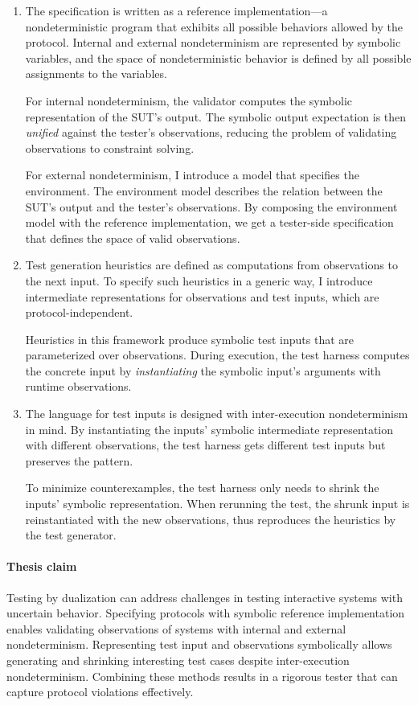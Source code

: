 \begin{enumerate}
\item The specification is written as a reference implementation---a
  nondeterministic program that exhibits all possible behaviors allowed by the
  protocol.  Internal and external nondeterminism are represented by symbolic
  variables, and the space of nondeterministic behavior is defined by all
  possible assignments to the variables.

  For internal nondeterminism, the validator computes the symbolic
  representation of the SUT's output.  The symbolic output expectation is then
  {\em unified} against the tester's observations, reducing the problem of
  validating observations to constraint solving.

  For external nondeterminism, I introduce a model that specifies the
  environment.  The environment model describes the relation between the SUT's
  output and the tester's observations.  By composing the environment model with
  the reference implementation, we get a tester-side specification that defines
  the space of valid observations.
\item Test generation heuristics are defined as computations from observations
  to the next input.  To specify such heuristics in a generic way, I introduce
  intermediate representations for observations and test inputs, which are
  protocol-independent.

  Heuristics in this framework produce symbolic test inputs that are
  parameterized over observations.  During execution, the test harness computes
  the concrete input by {\em instantiating} the symbolic input's arguments with
  runtime observations.
\item The language for test inputs is designed with inter-execution
  nondeterminism in mind.  By instantiating the inputs' symbolic intermediate
  representation with different observations, the test harness gets different
  test inputs but preserves the pattern.

  To minimize counterexamples, the test harness only needs to shrink the inputs'
  symbolic representation.  When rerunning the test, the shrunk input is
  reinstantiated with the new observations, thus reproduces the heuristics by
  the test generator.
\end{enumerate}

\paragraph{Thesis claim}
Testing by dualization can address challenges in testing interactive systems
with uncertain behavior.  Specifying protocols with symbolic reference
implementation enables validating observations of systems with internal and
external nondeterminism.  Representing test input and observations symbolically
allows generating and shrinking interesting test cases despite inter-execution
nondeterminism.  Combining these methods results in a rigorous tester that can
capture protocol violations effectively.

